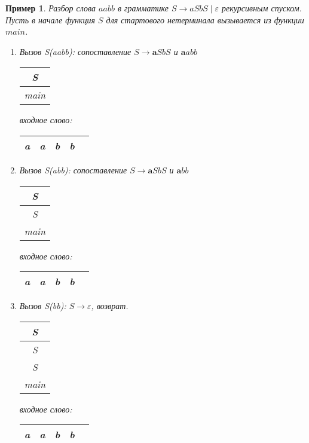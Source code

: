 \documentclass[10pt]{article}         %
\newtheorem{example}{Пример}
\begin{document}
	\begin{example}
		Разбор слова $aabb$ в грамматике $S \rightarrow aSbS \mid \varepsilon$ рекурсивным спуском. Пусть в начале функция $S$ для стартового нетерминала вызывается из функции $main$.
		
		\begin{enumerate}
			
			\item Вызов S(aabb): сопоставление $S \rightarrow \textbf{a}SbS$ и $\textbf{a}abb$
			
			\begin{tabular}[c]{ |c| } 
				\\ \hline
				S \\ \hline
				main \\ \hline
			\end{tabular}  
			\qquad  \qquad \qquad  \qquad входное слово: \,
			\begin{tabular}[c]{ |c|c|c|c|c| } 
				\hline
				\textbf{a} & a & b & b \\ \hline
			\end{tabular}

			
			\item Вызов S(abb): сопоставление $S \rightarrow \textbf{a}SbS$ и $\textbf{a}bb$
			
			\begin{tabular}[c]{ |c| } 
				\\ \hline
				S \\ \hline
				S \\ \hline
				main \\ \hline
			\end{tabular}  
			\qquad  \qquad \qquad  \qquad входное слово: \,
			\begin{tabular}[c]{ |c|c|c|c|c| } 
				\hline
				a & \textbf{a} & b & b \\ \hline
			\end{tabular}			
			
			\item Вызов S(bb): $S \rightarrow \varepsilon$, возврат.
			
			\begin{tabular}[c]{ |c| } 
				\\ \hline
				S \\ \hline
				S \\ \hline
				S \\ \hline
				main \\ \hline
			\end{tabular}  
			\qquad  \qquad \qquad  \qquad входное слово: \,
			\begin{tabular}[c]{ |c|c|c|c|c| } 
				\hline
				a & \textbf{a} & b & b \\ \hline
			\end{tabular}
			

\end{enumerate}
\end{example}
\end{document}
